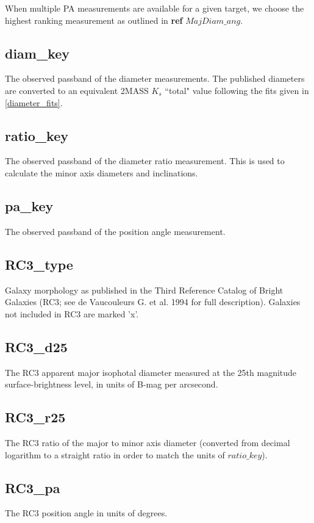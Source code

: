 \documentclass[iop]{emulateapj-rtx4}
\begin{document}
When multiple PA measurements are available for a given target, we choose the highest ranking measurement as outlined in \textbf{ref} $MajDiam\_ang$.

\subsection{diam\_key}
The observed passband of the diameter measurements. The published diameters are converted to an equivalent 2MASS $K_s$ ``total" value following the fits given in \ref{diameter_fits}.

\subsection{ratio\_key}
The observed passband of the diameter ratio measurement. This is used to calculate the minor axis diameters and inclinations.

\subsection{pa\_key}
The observed passband of the position angle measurement.

\subsection{RC3\_type}
Galaxy morphology as published in the Third Reference Catalog of Bright Galaxies (RC3; see de Vaucouleurs G. et al. 1994 for full description). Galaxies not included in RC3 are marked 'x'.

\subsection{RC3\_d25}
The RC3 apparent major isophotal diameter measured at the 25th magnitude surface-brightness level, in units of B-mag per arcsecond.

\subsection{RC3\_r25}
The RC3 ratio of the major to minor axis diameter (converted from decimal logarithm to a straight ratio in order to match the units of $ratio\_key$). 

\subsection{RC3\_pa}
The RC3 position angle in units of degrees.
\end{document}
